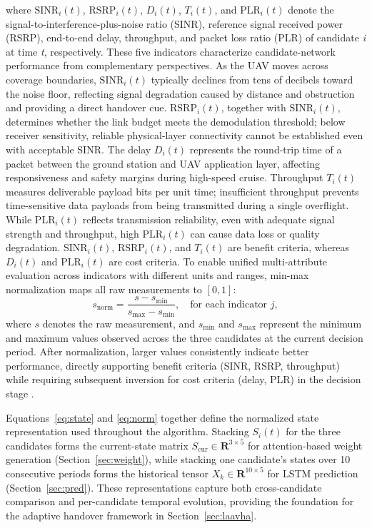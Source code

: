 \documentclass[preprint,12pt]{elsarticle}
\begin{document}
where $\mathrm{SINR}_i(t)$, $\mathrm{RSRP}_i(t)$, $D_i(t)$, $T_i(t)$, and $\mathrm{PLR}_i(t)$ denote the signal-to-interference-plus-noise ratio (SINR), reference signal received power (RSRP), end-to-end delay, throughput, and packet loss ratio (PLR) of candidate \textit{i} at time \textit{t}, respectively. These five indicators characterize candidate-network performance from complementary perspectives. As the UAV moves across coverage boundaries, $\mathrm{SINR}_i(t)$ typically declines from tens of decibels toward the noise floor, reflecting signal degradation caused by distance and obstruction and providing a direct handover cue. $\mathrm{RSRP}_i(t)$, together with $\mathrm{SINR}_i(t)$, determines whether the link budget meets the demodulation threshold; below receiver sensitivity, reliable physical-layer connectivity cannot be established even with acceptable SINR. The delay $D_i(t)$ represents the round-trip time of a packet between the ground station and UAV application layer, affecting responsiveness and safety margins during high-speed cruise. Throughput $T_i(t)$ measures deliverable payload bits per unit time; insufficient throughput prevents time-sensitive data payloads from being transmitted during a single overflight. While $\mathrm{PLR}_i(t)$ reflects transmission reliability, even with adequate signal strength and throughput, high $\mathrm{PLR}_i(t)$ can cause data loss or quality degradation. $\mathrm{SINR}_i(t)$, $\mathrm{RSRP}_i(t)$, and $T_i(t)$ are benefit criteria, whereas $D_i(t)$ and $\mathrm{PLR}_i(t)$ are cost criteria. To enable unified multi-attribute evaluation across indicators with different units and ranges, min-max normalization maps all raw measurements to $[0,1]$:
\begin{equation}
s_{\mathrm{norm}} = \frac{s-s_{\min}}{s_{\max}-s_{\min}},\quad \text{for each indicator }j,
\label{eq:norm}
\end{equation}
where $s$ denotes the raw measurement, and $s_{\min}$ and $s_{\max}$ represent the minimum and maximum values observed across the three candidates at the current decision period. After normalization, larger values consistently indicate better performance, directly supporting benefit criteria (SINR, RSRP, throughput) while requiring subsequent inversion for cost criteria (delay, PLR) in the decision stage \cite{ref11}.

Equations~\eqref{eq:state} and \eqref{eq:norm} together define the normalized state representation used throughout the algorithm. Stacking $S_i(t)$ for the three candidates forms the current-state matrix $S_{\mathrm{cur}}\in\mathbf{R}^{3\times5}$ for attention-based weight generation (Section~\ref{sec:weight}), while stacking one candidate's states over 10 consecutive periods forms the historical tensor $X_k\in\mathbf{R}^{10\times5}$ for LSTM prediction (Section~\ref{sec:pred}). These representations capture both cross-candidate comparison and per-candidate temporal evolution, providing the foundation for the adaptive handover framework in Section~\ref{sec:laavha}.
\end{document}
